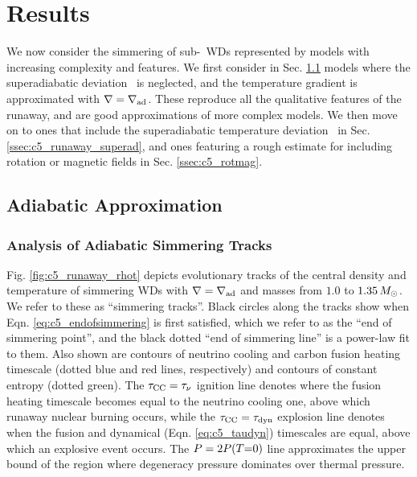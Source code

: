 \section{Results}
\label{sec:c5_results}

We now consider the simmering of sub-\Mch\ WDs represented by models with increasing complexity and features.  We first consider in Sec. \ref{ssec:c5_runaway_ad} models where the superadiabatic deviation \dnabconv\ is neglected, and the temperature gradient is approximated with $\nabla = \nablaad$. These reproduce all the qualitative features of the runaway, and are good approximations of more complex models.  We then move on to ones that include the superadiabatic temperature deviation \dnabconv\ in Sec. \ref{ssec:c5_runaway_superad}, and ones featuring a rough estimate for including rotation or magnetic fields in Sec. \ref{ssec:c5_rotmag}.

\subsection{Adiabatic Approximation}
\label{ssec:c5_runaway_ad}

\subsubsection{Analysis of Adiabatic Simmering Tracks}
\label{ssec:c5_runaway_ad_analysis}

Fig. \ref{fig:c5_runaway_rhot} depicts evolutionary tracks of the central density and temperature of simmering WDs with $\nabla = \nablaad$ and masses from $1.0$ to $1.35\,\Msun$.  We refer to these as ``simmering tracks''.  Black circles along the tracks show when Eqn. \ref{eq:c5_endofsimmering} is first satisfied, which we refer to as the ``end of simmering point'', and the black dotted ``end of simmering line'' is a power-law fit to them.  Also shown are contours of neutrino cooling and carbon fusion heating timescale (dotted blue and red lines, respectively) and contours of constant entropy (dotted green).  The $\taucc = \taunu$ ignition line denotes where the fusion heating timescale becomes equal to the neutrino cooling one, above which runaway nuclear burning occurs, while the $\taucc = \taudyn$ explosion line denotes when the fusion and dynamical (Eqn. \ref{eq:c5_taudyn}) timescales are equal, above which an explosive event occurs.  The $P = 2P(T\mathrm{=}0)$ line approximates the upper bound of the region where degeneracy pressure dominates over thermal pressure.

